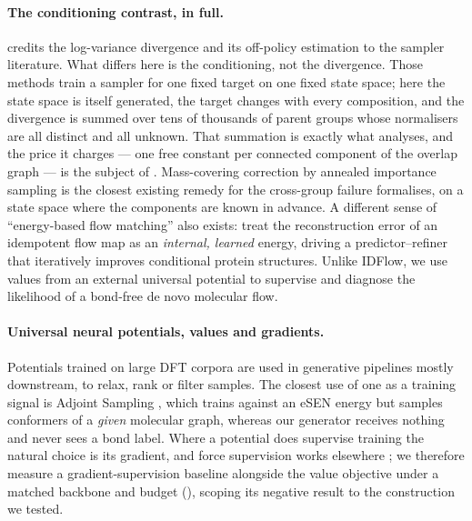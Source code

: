 \paragraph{The conditioning contrast, in full.}  credits the log-variance
divergence \citep{vargrad,nusken2021pathspace,berner2024optimalcontrol,richter2024improvedsampling}
and its off-policy estimation \citep{sendera2024offpolicy} to the sampler literature. What differs
here is the conditioning, not the divergence. Those methods train a sampler for one fixed target on
one fixed state space; here the state space is itself generated, the target changes with every
composition, and the divergence is summed over tens of thousands of parent groups whose normalisers
are all distinct and all unknown. That summation is exactly what  analyses, and the
price it charges --- one free constant per connected component of the overlap graph --- is the
subject of . Mass-covering correction by annealed importance sampling \citep{fab}
is the closest existing remedy for the cross-group failure  formalises, on a state
space where the components are known in advance. A different sense of ``energy-based flow matching''
also exists: \citet{idflow} treat the reconstruction error of an idempotent flow map as an
\emph{internal, learned} energy, driving a predictor--refiner that iteratively improves conditional
protein structures. Unlike IDFlow, we use values from an external universal potential to supervise
and diagnose the likelihood of a bond-free de novo molecular flow.

\paragraph{Universal neural potentials, values and gradients.} Potentials trained on large DFT
corpora \citep{omol25,esen} are used in generative pipelines mostly downstream, to relax, rank or
filter samples. The closest use of one as a training signal is Adjoint Sampling
\citep{adjointsampling}, which trains against an eSEN energy but samples conformers of a
\emph{given} molecular graph, whereas our generator receives nothing and never sees a bond label.
Where a potential does supervise training the natural choice is its gradient, and force supervision
works elsewhere \citep{psm,driftingboltzmann}; we therefore measure a gradient-supervision baseline
alongside the value objective under a matched backbone and budget (), scoping
its negative result to the construction we tested.
